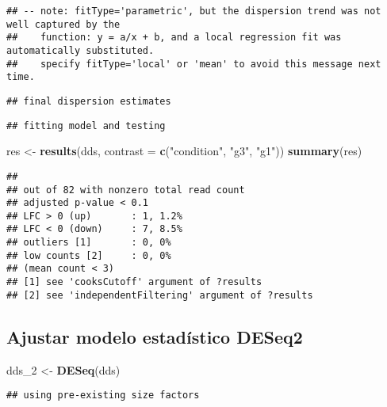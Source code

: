 \documentclass[
]{article}
\newenvironment{Shaded}{\begin{snugshade}}{\end{snugshade}}
\newcommand{\AttributeTok}[1]{\textcolor[rgb]{0.13,0.29,0.53}{#1}}
\newcommand{\FunctionTok}[1]{\textcolor[rgb]{0.13,0.29,0.53}{\textbf{#1}}}
\newcommand{\NormalTok}[1]{#1}
\newcommand{\OtherTok}[1]{\textcolor[rgb]{0.56,0.35,0.01}{#1}}
\newcommand{\StringTok}[1]{\textcolor[rgb]{0.31,0.60,0.02}{#1}}
\begin{document}
\begin{verbatim}
## -- note: fitType='parametric', but the dispersion trend was not well captured by the
##    function: y = a/x + b, and a local regression fit was automatically substituted.
##    specify fitType='local' or 'mean' to avoid this message next time.
\end{verbatim}

\begin{verbatim}
## final dispersion estimates
\end{verbatim}

\begin{verbatim}
## fitting model and testing
\end{verbatim}

\begin{Shaded}
\begin{Highlighting}[]
\NormalTok{res }\OtherTok{\textless{}{-}} \FunctionTok{results}\NormalTok{(dds, }\AttributeTok{contrast =} \FunctionTok{c}\NormalTok{(}\StringTok{"condition"}\NormalTok{, }\StringTok{"g3"}\NormalTok{, }\StringTok{"g1"}\NormalTok{))}
\FunctionTok{summary}\NormalTok{(res)}
\end{Highlighting}
\end{Shaded}

\begin{verbatim}
## 
## out of 82 with nonzero total read count
## adjusted p-value < 0.1
## LFC > 0 (up)       : 1, 1.2%
## LFC < 0 (down)     : 7, 8.5%
## outliers [1]       : 0, 0%
## low counts [2]     : 0, 0%
## (mean count < 3)
## [1] see 'cooksCutoff' argument of ?results
## [2] see 'independentFiltering' argument of ?results
\end{verbatim}

\subsection{Ajustar modelo estadístico
DESeq2}\label{ajustar-modelo-estaduxedstico-deseq2}

\begin{Shaded}
\begin{Highlighting}[]
\NormalTok{dds\_2 }\OtherTok{\textless{}{-}} \FunctionTok{DESeq}\NormalTok{(dds)}
\end{Highlighting}
\end{Shaded}

\begin{verbatim}
## using pre-existing size factors
\end{verbatim}
\end{document}
